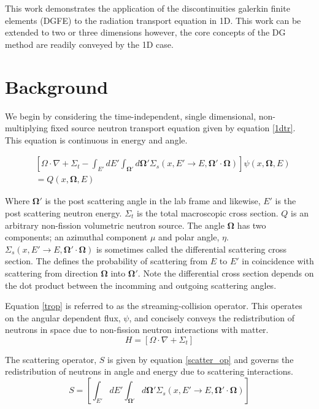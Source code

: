 This work demonstrates the application of the discontinuities galerkin finite elements (DGFE)
to the radiation transport equation in 1D.  This work can be extended to two or
three dimensions however, the core concepts of the DG method are readily conveyed by the 1D case.

\section{Background}

We begin by considering the time-independent, single dimensional, non-multiplying fixed source neutron transport equation given by equation \ref{1dtr}.  This equation is continuous in energy and angle.

\begin{eqnarray}
& \left[ \Omega \cdot \nabla + \Sigma_t -
\int_{E'} dE' \int_{\mathbf\Omega'} d \mathbf\Omega'
\Sigma_s \left(x, E' \rightarrow E , \mathbf\Omega' \cdot \mathbf\Omega \right) \right] 
\psi(x, \mathbf\Omega, E)  \nonumber \\
& =
Q(x, \mathbf\Omega, E)
\label{1dtr}
\end{eqnarray}

Where $\mathbf\Omega'$ is the post scattering angle in the lab frame and likewise, $E'$ is the post scattering neutron energy.  $\Sigma_t$ is the total macroscopic cross section.  $Q$ is an arbitrary non-fission volumetric neutron source.  The angle $\mathbf\Omega$ has two components; an azimuthal component $\mu$ and polar angle, $\eta$.
$\Sigma_s \left(x, E' \rightarrow E , \mathbf\Omega' \cdot \mathbf\Omega \right)$ is sometimes called the differential scattering cross section.  The defines the probability of scattering from $E$ to $E'$ in coincidence with scattering from direction $\mathbf\Omega$ into $\mathbf\Omega'$.  Note the differential cross section depends on the dot product between the incomming and outgoing scattering angles.  

Equation \ref{trop} is referred to as the streaming-collision operator.  This operates on the angular dependent flux, $\psi$, and concisely conveys the redistribution of neutrons in space due to non-fission neutron interactions with matter.
\begin{equation}
H = \left[ \Omega \cdot \nabla + \Sigma_t 
 \right]
\label{trop}
\end{equation}

The scattering operator, $S$ is given by equation \ref{scatter_op} and governs the redistribution of neutrons in angle and energy due to scattering interactions.
\begin{equation}
S = \left[ 
\int_{E'} dE' \int_{\mathbf\Omega'} d \mathbf\Omega'
\Sigma_s \left(x, E' \rightarrow E , \mathbf\Omega' \cdot \mathbf\Omega \right)
 \right]
\label{scatter_op}
\end{equation}

